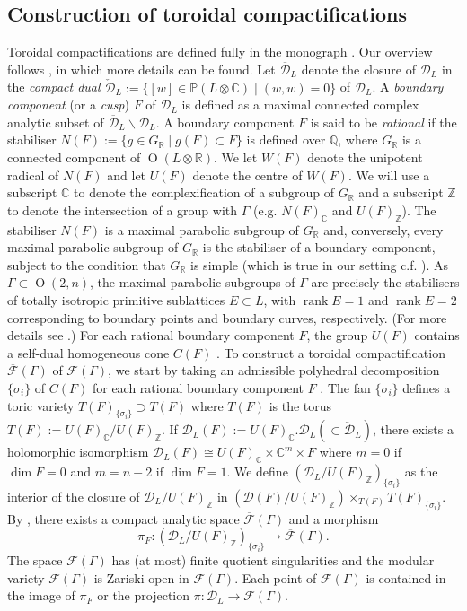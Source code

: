\documentclass[12pt, a4paper]{article}
\newcommand{\RR}{\mathbb{R}}
\newcommand{\CC}{\mathbb{C}}
\newcommand{\ZZ}{\mathbb{Z}}
\newcommand{\QQ}{\mathbb{Q}}
\newcommand{\PP}{\mathbb{P}}
\newcommand{\dc}{\mathcal{D}}
\newcommand{\fc}{\mathcal{F}}
\newcommand{\opn}{\operatorname}
\begin{document}
\subsection{Construction of toroidal compactifications}
Toroidal compactifications are defined fully in the monograph \cite{AMRT}.
Our overview follows \cite{Kondo}, in which more details can be found.
Let $\overline{\dc}_L$ denote the closure of $\dc_L$ in the \emph{compact dual} $\check{\dc}_L := \{[w] \in \PP(L \otimes \CC) \mid (w,w)=0 \}$ of $\dc_L$.
A \emph{boundary component} (or a \emph{cusp}) $F$ of $\dc_L$ is defined as a maximal connected complex analytic subset of $\overline{\dc}_L \backslash \dc_L$.
A boundary component $F$ is said to be \emph{rational} if the stabiliser $N(F):=\{g \in G_{\RR} \mid g(F) \subset F \}$ is defined over $\QQ$, where $G_{\RR}$ is a connected component of $\opn{O}(L \otimes \RR)$.
We let $W(F)$ denote the unipotent radical of $N(F)$ and let $U(F)$ denote the centre of $W(F)$.
We will use a subscript $\CC$ to denote the complexification of a subgroup of $G_{\RR}$ and a subscript $\ZZ$ to denote the intersection of a group with $\Gamma$ (e.g. $N(F)_{\CC}$ and $U(F)_{\ZZ}$).
The stabiliser $N(F)$ is a maximal parabolic subgroup of $G_{\RR}$ and, conversely, every maximal parabolic subgroup of $G_{\RR}$ is the stabiliser of a boundary component, subject to the condition that $G_{\RR}$ is simple (which is true in our setting c.f. \cite[Proposition 3.9 \S III.3]{AMRT}).
As $\Gamma \subset \opn{O}(2, n)$, the maximal parabolic subgroups of $\Gamma$ are precisely the stabilisers of totally isotropic primitive sublattices $E \subset L$, with $\opn{rank}E = 1$ and $\opn{rank}E=2$ corresponding to boundary points and  boundary curves, respectively. (For more details see \cite{AMRT, borelji, Piatetski-Shapiro, Satake1, Handbook}.)
For each rational boundary component $F$, the group $U(F)$ contains a self-dual homogeneous cone $C(F)$ \cite[\S III.4]{AMRT}.
To construct a toroidal compactification $\overline{\fc}(\Gamma)$ of $\fc(\Gamma)$, we start by taking an admissible polyhedral decomposition $\{\sigma_i\}$ of $C(F)$ for each rational boundary component $F$ \cite[\S II.4]{AMRT}.
The fan $\{ \sigma_i \}$ defines a toric variety $T(F)_{\{\sigma_i \}} \supset T(F)$ where $T(F)$ is the torus $T(F):=U(F)_{\CC} / U(F)_{\ZZ}$.
If $\dc_L(F):=U(F)_{\CC}. \dc_L (\subset \check{\dc}_L)$, there exists a holomorphic isomorphism $\dc_L(F)  \cong U(F)_{\CC} \times \CC^m \times F$ where $m=0$ if $\opn{dim} F = 0$ and $m=n-2$ if $\opn{dim} F = 1$. 
We define $(\dc_L / U(F)_{\ZZ})_{\{\sigma_i \}}$ as the interior of the closure of $\dc_L/U(F)_{\ZZ}$ in $( \dc(F)/U(F)_{\ZZ}) \times_{T(F)} T(F)_{\{\sigma_i \}}$. By \cite[Theorem 5.2 \S III]{AMRT}, there exists a compact analytic space $\overline{\fc}(\Gamma)$ and a morphism
\[
  \pi_F: (\dc_L / U(F)_{\ZZ})_{\{\sigma_i \}}
  \rightarrow
  \overline{\fc}(\Gamma).
  \]
  The space $\overline{\fc}(\Gamma)$ has (at most) finite quotient singularities and the modular variety $\fc(\Gamma)$ is Zariski open in $\overline{\fc}(\Gamma)$.
  Each point of $\overline{\fc}(\Gamma)$ is contained in the image of $\pi_F$ or the projection $\pi: \dc_L \rightarrow \fc(\Gamma)$.
\end{document}
